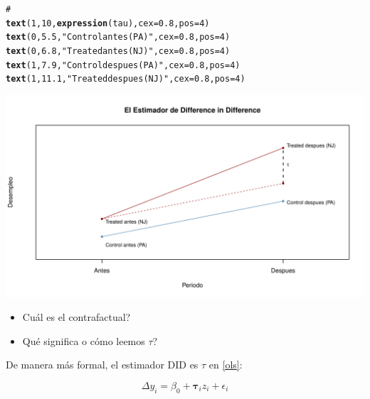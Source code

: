 \documentclass[onesided]{article}\usepackage[]{graphicx}\usepackage[]{color}
\makeatletter
\def\maxwidth{ %
  \ifdim\Gin@nat@width>\linewidth
    \linewidth
  \else
    \Gin@nat@width
  \fi
}
\newcommand{\hlnum}[1]{\textcolor[rgb]{0.686,0.059,0.569}{#1}}%
\newcommand{\hlstr}[1]{\textcolor[rgb]{0.192,0.494,0.8}{#1}}%
\newcommand{\hlcom}[1]{\textcolor[rgb]{0.678,0.584,0.686}{\textit{#1}}}%
\newcommand{\hlstd}[1]{\textcolor[rgb]{0.345,0.345,0.345}{#1}}%
\newcommand{\hlkwc}[1]{\textcolor[rgb]{0.333,0.667,0.333}{#1}}%
\newcommand{\hlkwd}[1]{\textcolor[rgb]{0.737,0.353,0.396}{\textbf{#1}}}%
\newenvironment{kframe}{%
 \def\at@end@of@kframe{}%
 \ifinner\ifhmode%
  \def\at@end@of@kframe{\end{minipage}}%
  \begin{minipage}{\columnwidth}%
 \fi\fi%
 \def\FrameCommand##1{\hskip\@totalleftmargin \hskip-\fboxsep
 \colorbox{shadecolor}{##1}\hskip-\fboxsep
     \hskip-\linewidth \hskip-\@totalleftmargin \hskip\columnwidth}%
 \MakeFramed {\advance\hsize-\width
   \@totalleftmargin\z@ \linewidth\hsize
   \@setminipage}}%
 {\par\unskip\endMakeFramed%
 \at@end@of@kframe}
\newenvironment{knitrout}{}{} %
\makeatother
\begin{document}
\begin{knitrout}
\begin{kframe}
\begin{alltt}
\hlcom{# }
\hlkwd{text}\hlstd{(}\hlnum{1}\hlstd{,} \hlnum{10}\hlstd{,} \hlkwd{expression}\hlstd{(tau),} \hlkwc{cex} \hlstd{=} \hlnum{0.8}\hlstd{,} \hlkwc{pos} \hlstd{=} \hlnum{4}\hlstd{)}
\hlkwd{text}\hlstd{(}\hlnum{0}\hlstd{,} \hlnum{5.5}\hlstd{,} \hlstr{"Control antes (PA)"}\hlstd{,} \hlkwc{cex} \hlstd{=} \hlnum{0.8} \hlstd{,} \hlkwc{pos} \hlstd{=} \hlnum{4}\hlstd{)}
\hlkwd{text}\hlstd{(}\hlnum{0}\hlstd{,} \hlnum{6.8}\hlstd{,} \hlstr{"Treated antes (NJ)"}\hlstd{,} \hlkwc{cex} \hlstd{=} \hlnum{0.8} \hlstd{,} \hlkwc{pos} \hlstd{=} \hlnum{4}\hlstd{)}
\hlkwd{text}\hlstd{(}\hlnum{1}\hlstd{,} \hlnum{7.9}\hlstd{,} \hlstr{"Control despues (PA)"}\hlstd{,} \hlkwc{cex} \hlstd{=} \hlnum{0.8} \hlstd{,} \hlkwc{pos} \hlstd{=} \hlnum{4}\hlstd{)}
\hlkwd{text}\hlstd{(}\hlnum{1}\hlstd{,} \hlnum{11.1}\hlstd{,} \hlstr{"Treated despues (NJ)"}\hlstd{,} \hlkwc{cex} \hlstd{=} \hlnum{0.8} \hlstd{,} \hlkwc{pos} \hlstd{=} \hlnum{4}\hlstd{)}
\end{alltt}
\end{kframe}

{\centering \includegraphics[width=\maxwidth]{figure/dif:dif-1} 

}


\end{knitrout}

\begin{itemize}
\item {\color{red}Cu\'al es el contrafactual?}
\item {\color{red}Qu\'e significa o c\'omo leemos $\tau$?}
\end{itemize}


De manera m\'as formal, el estimador DID es $\tau$ en \autoref{ols}:

\begin{equation}\label{ols}
\Delta y_{i} = \beta_{0} + {\mathbf \tau_{i}z_{i}} + \epsilon_{i}
\end{equation}
\end{document}
